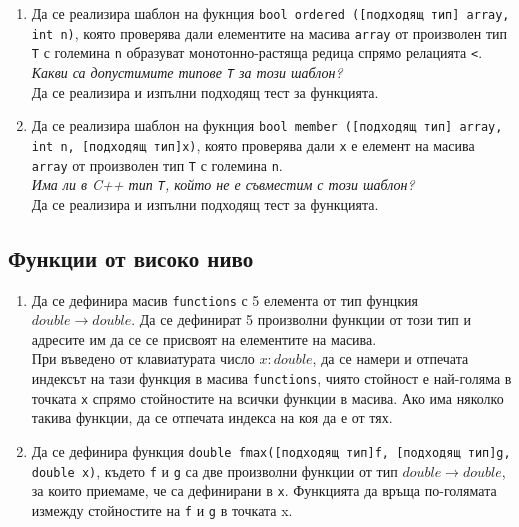 {\begin{enumerate}
	Да се реализира и изпълни подходящ тест за функцията.

	\item Да се реализира шаблон на фукнция \texttt{bool ordered ([подходящ тип] array, int n)}, която проверява дали елементите на масива \texttt{array} от произволен тип \texttt{T} с големина \texttt{n} образуват монотонно-растяща редица спрямо релацията \texttt{<}.\\

	\textit{Какви са допустимите типове \texttt{T} за този шаблон?}\\

	Да се реализира и изпълни подходящ тест за функцията.

	\item Да се реализира шаблон на фукнция \texttt{bool member ([подходящ тип] array, int n, [подходящ тип]x)}, която проверява дали \texttt{x} е елемент на масива \texttt{array} от произволен тип \texttt{T} с големина \texttt{n}.\\

	\textit{Има ли в C++ тип \texttt{T}, който не е съвместим с този шаблон?}\\

	Да се реализира и изпълни подходящ тест за функцията.

\end{enumerate}

\pagebreak
\subsection {Функции от високо ниво}

\begin{enumerate}[resume]  


	\item Да се дефинира масив \texttt{functions} с 5 елемента от тип фунцкия $double \rightarrow double$. Да се дефинират 5 произволни функции от този тип и адресите им да се се присвоят на елементите на масива.\\

	При въведено от клавиатурата число $x:double$, да се намери и отпечата индексът на тази функция в масива \texttt{functions}, чиято стойност е най-голяма в точката \texttt{x} спрямо стойностите на всички функции в масива. Ако има няколко такива функции, да се отпечата индекса на коя да е от тях.

	\item Да се дефинира функция \texttt{double fmax([подходящ тип]f, [подходящ тип]g, double x)}, където \texttt{f} и \texttt{g} са две произволни функции от тип $double \rightarrow double$, за които приемаме, че са дефинирани в \texttt{x}.  Функцията да връща по-голямата измежду стойностите на \texttt{f} и \texttt{g} в точката x.\\


\end{enumerate}}
